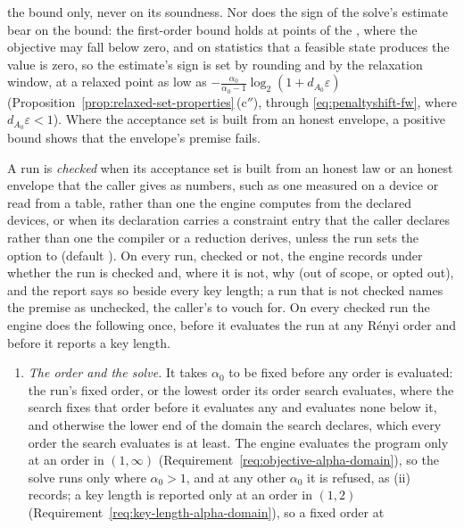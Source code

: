 the bound only, never on its soundness. Nor does the
sign of the solve's estimate bear on the bound: the first-order bound holds
at points of the , where the objective may fall below
zero, and on statistics that a feasible state produces the value is zero, so
the estimate's sign is set by rounding and by the relaxation window, at a
relaxed point as low as
$-\frac{\alpha_0}{\alpha_0-1}\log_2(1+d_{A_0}\varepsilon)$
(Proposition~\ref{prop:relaxed-set-properties}\,(c$''$), through
\eqref{eq:penaltyshift-fw}, where $d_{A_0}\varepsilon<1$). Where the acceptance set is built from
an honest envelope, a positive bound shows that the envelope's premise
 fails.

\begin{requirement}\label{req:unreachable-acceptance-set}
A run is \emph{checked} when its acceptance set is built from an honest law
or an honest envelope that the caller gives as numbers, such as one measured
on a device or read from a table, rather than one the engine computes from
the declared devices, or when its declaration carries a constraint entry
that the caller declares rather than one the compiler or a reduction
derives, unless the run sets the option  to
 (default ). On every run, checked or not, the engine
records under  whether the run is checked and,
where it is not, why (out of scope, or opted out), and the report says so
beside every key length; a run that is not checked names the premise
 as unchecked, the caller's to vouch for. On
every checked run the engine does the following once, before it evaluates
the run at any R\'enyi order and before it reports a key length.
\begin{enumerate}[label=(\roman*),leftmargin=2.4em]
\item \emph{The order and the solve.} It takes $\alpha_0$ to be fixed before
  any order is evaluated: the run's fixed order, or the lowest order its
  order search evaluates, where the search fixes that order before it
  evaluates any and evaluates none below it, and otherwise the lower end of
  the domain the search declares, which every order the search evaluates is
  at least. The engine evaluates the program only at an order in
  $(1,\infty)$ (Requirement~\ref{req:objective-alpha-domain}), so the solve
  runs only where $\alpha_0>1$, and at any other $\alpha_0$ it is refused,
  as (ii) records; a key length is reported only at an order in $(1,2)$
  (Requirement~\ref{req:key-length-alpha-domain}), so a fixed order at

\end{enumerate}
\end{requirement}

